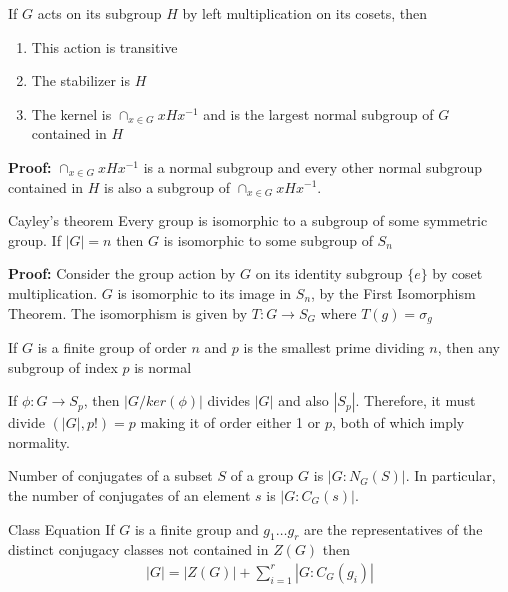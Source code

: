\documentclass[titlepage, 12pt]{book}
\begin{document}
\begin{theorem}{}{}
    If $G$ acts on its subgroup $H$ by left multiplication on its cosets, then
    \begin{enumerate}
        \item This action is transitive
        \item The stabilizer is $H$
        \item The kernel is $\cap_{x\in G} xHx^{-1}$ and is the largest normal
            subgroup of $G$ contained in $H$
    \end{enumerate}
\end{theorem}
\textbf{Proof:} $\cap_{x\in G} xHx^{-1}$ is a normal subgroup and every other
normal subgroup contained in $H$ is also a subgroup of $\cap_{x\in G} xHx^{-1}$.

\begin{theorem}{Cayley's theorem}{}
    Every group is isomorphic to a subgroup of some symmetric group. If $|G| =
    n$ then $G$ is isomorphic to some subgroup of $S_n$
\end{theorem}
\textbf{Proof:} Consider the group action by $G$ on its identity subgroup $\{e\}$
by coset multiplication. $G$ is isomorphic to its image in $S_n$, by the First
Isomorphism Theorem. The isomorphism is given by $T:G\rightarrow S_G$ where
$T(g) = \sigma_g$

\begin{theorem}{}{}
    If $G$ is a finite group of order $n$ and $p$ is the smallest prime dividing
    $n$, then any subgroup of index $p$ is normal
\end{theorem}
If $\phi:G\rightarrow S_p$, then $|G/ker(\phi)|$ divides $|G|$ and also $|S_p|$.
Therefore, it must divide $(|G|, p!) = p$ making it of order either 1 or $p$,
both of which imply normality.

\begin{proposition}{}{}
    Number of conjugates of a subset $S$ of a group $G$ is $|G:N_G(S)|$. In
    particular, the number of conjugates of an element $s$ is $|G:C_G(s)|$.
\end{proposition}

\begin{theorem}{Class Equation}{}
    If $G$ is a finite group and $g_1\dots g_r$ are the representatives of the
    distinct conjugacy classes not contained in $Z(G)$ then
    \begin{gather*}
        |G| = |Z(G)| + \sum_{i = 1}^r |G : C_G(g_i)|
    \end{gather*}
\end{theorem}
\end{document}
